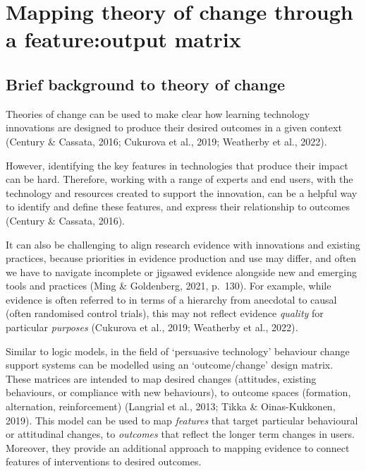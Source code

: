 \documentclass[
]{book}
\begin{document}
\hypertarget{model}{%
\chapter{Mapping theory of change through a feature:output matrix}\label{model}}

\hypertarget{brief-background-to-theory-of-change}{%
\section{Brief background to theory of change}\label{brief-background-to-theory-of-change}}

Theories of change can be used to make clear how learning technology
innovations are designed to produce their desired outcomes in a given
context (Century \& Cassata, 2016; Cukurova et al., 2019; Weatherby et
al., 2022).

However, identifying the key features in technologies that produce their
impact can be hard. Therefore, working with a range of experts and end
users, with the technology and resources created to support the
innovation, can be a helpful way to identify and define these features,
and express their relationship to outcomes (Century \& Cassata, 2016).

It can also be challenging to align research evidence with innovations
and existing practices, because priorities in evidence production and
use may differ, and often we have to navigate incomplete or jigsawed
evidence alongside new and emerging tools and practices (Ming \&
Goldenberg, 2021, p.~130). For example, while evidence is often referred
to in terms of a hierarchy from anecdotal to causal (often randomised
control trials), this may not reflect evidence \emph{quality} for particular
\emph{purposes} (Cukurova et al., 2019; Weatherby et al., 2022)\emph{.}

Similar to logic models, in the field of `persuasive technology'
behaviour change support systems can be modelled using an
`outcome/change' design matrix. These matrices are intended to map
desired changes (attitudes, existing behaviours, or compliance with new
behaviours), to outcome spaces (formation, alternation, reinforcement)
(Langrial et al., 2013; Tikka \& Oinas-Kukkonen, 2019). This model can be
used to map \emph{features} that target particular behavioural or attitudinal
changes, to \emph{outcomes} that reflect the longer term changes in users.
Moreover, they provide an additional approach to mapping evidence to
connect features of interventions to desired outcomes.
\end{document}

